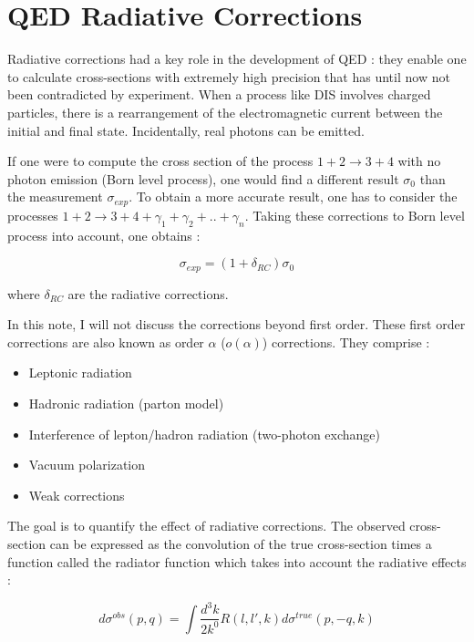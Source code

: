 
\section{QED Radiative Corrections}

Radiative corrections had a key role in the development of QED : they enable one to calculate cross-sections with extremely high precision that has until now not been contradicted by experiment. When a process like DIS involves charged particles, there is a rearrangement of the electromagnetic current between the initial and final state. Incidentally, real photons can be emitted.

If one were to compute the cross section of the process $1+2 \rightarrow 3+4$ with no photon emission (Born level process), one would find a different result $\sigma_{0}$ than the measurement $\sigma_{exp}$. To obtain a more accurate result, one has to consider the processes $1+2 \rightarrow 3+4+\gamma_1+\gamma_2+..+\gamma_n$. Taking these corrections to Born level process into account, one obtains :

\begin{equation} \label{eq:RC}
  \sigma_{exp} = (1+\delta_{RC})\sigma_0
\end{equation}

where $\delta_{RC}$ are the radiative corrections.


In this note, I will not discuss the corrections beyond first order. These first order corrections are also known as order $\alpha$
($o(\alpha)$) corrections. They comprise :
\begin{itemize}
\item Leptonic radiation
\item Hadronic radiation (parton model)
\item Interference of lepton/hadron radiation (two-photon exchange)
\item Vacuum polarization
\item Weak corrections
\end{itemize}

The goal is to quantify the effect of radiative corrections. The observed cross-section can be expressed as the convolution of the true cross-section times a function called the radiator function which takes into account the radiative effects :

\[d\sigma^{obs}(p,q) = \int \frac{d^{3}k}{2k^{0}}R(l,l',k)d\sigma^{true}(p,-q,k)\]

